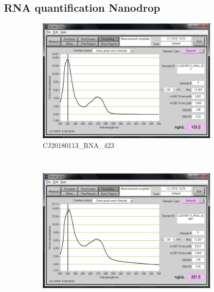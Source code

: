 \subsection{RNA quantification Nanodrop}
\label{task:20180113_cj1}

\begin{figure}[H] %
    \centering
    \caption{Screenshots of the NanoDrop analysis of RNA samples extracted from bacterial cultures}
    \label{fig:CJ20180113_RNA}
    \begin{subfigure}[b]{0.3\textwidth}
        \includegraphics[width=\textwidth]{graphics/screenshots/CJ20180113_RNA_423.jpg}
        \caption{CJ20180113\_RNA\_423}
        \label{sfig:CJ20180113_RNA_423}
    \end{subfigure}
    ~ 
    \begin{subfigure}[b]{0.3\textwidth}
        \includegraphics[width=\textwidth]{graphics/screenshots/CJ20180113_RNA_ALMIX.jpg}

\end{subfigure}
\end{figure}
